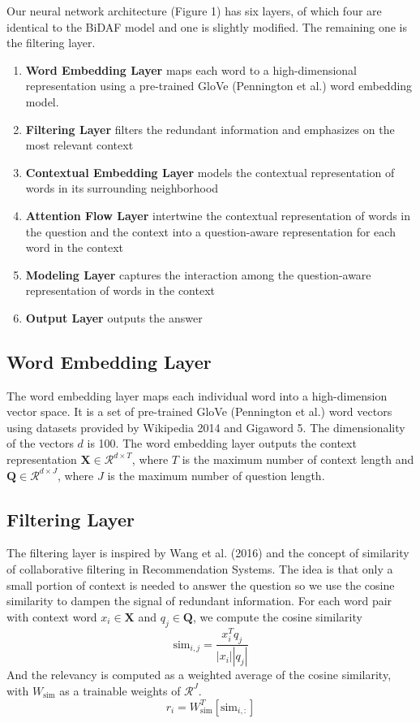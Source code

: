 \documentclass{article} %
\begin{document}
Our neural network architecture (Figure 1) has six layers, of which four are identical to the BiDAF model and one is slightly modified. The remaining one is the filtering layer.
\begin{enumerate}
\item \textbf{Word Embedding Layer} maps each word to a high-dimensional representation using a pre-trained GloVe (Pennington et al.) word embedding model.
\item \textbf{Filtering Layer} filters the redundant information and emphasizes on the most relevant context
\item \textbf{Contextual Embedding Layer} models the contextual representation of words in its surrounding neighborhood
\item \textbf{Attention Flow Layer} intertwine the contextual representation of words in the question and the context into a question-aware representation for each word in the context
\item \textbf{Modeling Layer}  captures the interaction among the question-aware representation of words in the context
\item \textbf{Output Layer} outputs the answer
\end{enumerate}
\subsection{Word Embedding Layer}

The word embedding layer maps each individual word into a high-dimension vector space. It is a set of pre-trained GloVe (Pennington et al.) word vectors using datasets provided by Wikipedia 2014 and Gigaword 5. The dimensionality of the vectors $d$ is 100. The word embedding layer outputs the context representation $\textbf{X} \in \mathcal{R}^{d \times T}$, where $T$ is the maximum number of context length and $ \textbf{Q} \in \mathcal{R}^{d \times J}$, where $J$ is the maximum number of question length.

\subsection{Filtering Layer}

The filtering layer is inspired by Wang et al. (2016) and the concept of similarity of collaborative filtering in Recommendation Systems. The idea is that only a small portion of context is needed to answer the question so we use the cosine similarity to dampen the signal of redundant information. For each word pair with context word $x_i \in \textbf{X}$ and $q_j \in \textbf{Q}$, we compute the cosine similarity
$$\text{sim}_{i,j} = \frac{x_i^T q_j}{|x_i||q_j|}$$
And the relevancy is computed as a weighted average of the cosine similarity, with $W_{\text{sim}}$ as a trainable weights of $\mathcal{R}^{J}$.
$$r_i = W_{\text{sim}}^T\left[\text{sim}_{i,:}\right]$$
\end{document}
